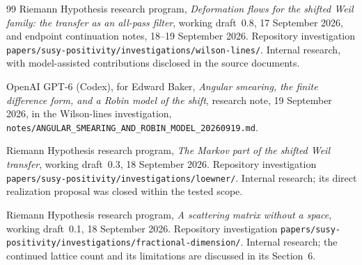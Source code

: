 \begin{thebibliography}{99}
Riemann Hypothesis research program, \emph{Deformation flows for the
shifted Weil family: the transfer as an all-pass filter}, working
draft~0.8, 17 September 2026, and endpoint continuation notes,
18--19 September 2026. Repository investigation
\nolinkurl{papers/susy-positivity/investigations/wilson-lines/}.
Internal research, with model-assisted contributions disclosed in
the source documents.

OpenAI GPT-6 (Codex), for Edward Baker,
\emph{Angular smearing, the finite difference form, and a Robin model
of the shift}, research note, 19 September 2026, in the Wilson-lines
investigation, \nolinkurl{notes/ANGULAR_SMEARING_AND_ROBIN_MODEL_20260919.md}.

Riemann Hypothesis research program,
\emph{The Markov part of the shifted Weil transfer}, working
draft~0.3, 18 September 2026. Repository investigation
\nolinkurl{papers/susy-positivity/investigations/loewner/}.
Internal research; its direct realization proposal was closed within
the tested scope.

Riemann Hypothesis research program,
\emph{A scattering matrix without a space}, working draft~0.1,
18 September 2026. Repository investigation
\nolinkurl{papers/susy-positivity/investigations/fractional-dimension/}.
Internal research; the continued lattice count and its limitations
are discussed in its Section~6.

\end{thebibliography}
